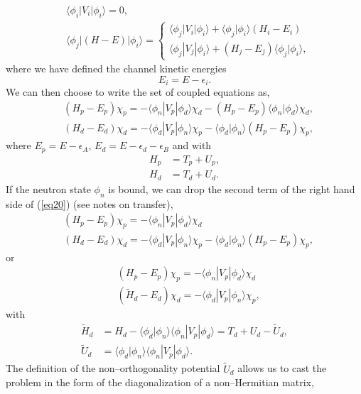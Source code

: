 \documentclass[a4paper,11pt]{article}
\newcommand{\braket}[1]{\langle {#1} \rangle }
\newcommand{\ket}[1]{|{#1} \rangle }
\newcommand{\bra}[1]{\langle {#1}|}
\begin{document}
\begin{align}\label{eq157}
\nonumber &\braket{\phi_i|V_i|\phi_i}=0,\\
&\langle\phi_j|(H-E)|\phi_i\rangle=\left\{\begin{array}{l}
\braket{\phi_j|V_i|\phi_i}+\braket{\phi_j|\phi_i}(H_i-E_i) \\ 
\braket{\phi_j|V_j|\phi_i}+(H_j-E_j) \braket{\phi_j|\phi_i},
\end{array}\right.
\end{align}
where we have defined the  channel kinetic energies 
\begin{equation}\label{eq159}
E_i=E-\epsilon_i.
\end{equation}
We can then choose to write the set of coupled equations as,
\begin{align}\label{eq20}
\nonumber &(H_p-E_p)\chi_p=-\bra{\phi_n}V_p\ket{\phi_d}\chi_d-(H_p-E_p)\braket{\phi_n|\phi_d}\chi_d,\\
&(H_d-E_d)\chi_d=-\bra{\phi_d}V_p\ket{\phi_n}\chi_p-\braket{\phi_d|\phi_n}(H_p-E_p)\chi_p,
\end{align}
where $E_p=E-\epsilon_A$, $E_d=E-\epsilon_d-\epsilon_B$ and
with
\begin{align}\label{eq21}
\nonumber H_p&=T_p+U_p,\\
H_d&=T_d+U_d.
\end{align}
If the neutron state $\phi_n$ is bound, we can drop the second term of the right hand side of (\ref{eq20}) (see notes on transfer),
 \begin{align}\label{eq62}
 \nonumber &(H_p-E_p)\chi_p=-\bra{\phi_n}V_p\ket{\phi_d}\chi_d\\
 &(H_d-E_d)\chi_d=-\bra{\phi_d}V_p\ket{\phi_n}\chi_p-\braket{\phi_d|\phi_n}(H_p-E_p)\chi_p,
 \end{align}
or
 \begin{align}\label{eq63}
 \nonumber &(H_p-E_p)\chi_p=-\bra{\phi_n}V_p\ket{\phi_d}\chi_d\\
 &(\widetilde H_d-E_d)\chi_d=-\bra{\phi_d}V_p\ket{\phi_n}\chi_p,
 \end{align}
 with
  \begin{align}\label{eq64}
  \nonumber \widetilde H_d&=H_d-\braket{\phi_d|\phi_n}\bra{\phi_n}V_p\ket{\phi_d}=T_d+U_d-\widetilde U_d,\\
   \widetilde U_d&=\braket{\phi_d|\phi_n}\bra{\phi_n}V_p\ket{\phi_d}.
  \end{align}
  The definition of the non--orthogonality potential $\widetilde U_d$ allows us to cast the problem in the form of the diagonalization of a non--Hermitian matrix,
\end{document}

